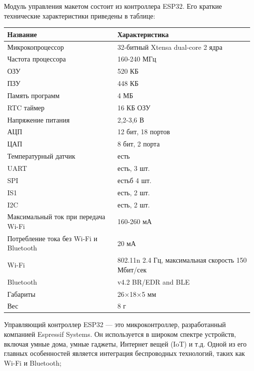Модуль управления макетом состоит из контроллера ESP32. Его краткие технические характеристики приведены в таблице:

\begin{table}[H]
    \centering
    \begin{tabular}{|p{6.5cm}|p{7.5cm}|}
        \hline
        Название & Характеристика \\
        \hline
        Микрокопроцессор & 32-битный Xtensa dual-core 2 ядра \\
        \hline
        Частота процессора & 160-240 МГц \\
        \hline
        ОЗУ & 520 КБ \\
        \hline
        ПЗУ & 448 КБ \\
        \hline
        Память программ & 4 МБ \\
        \hline
        RTC таймер & 16 КБ ОЗУ \\
        \hline
        Напряжение питания & 2,2-3,6 В \\
        \hline
        АЦП & 12 бит, 18 портов \\
        \hline
        ЦАП & 8 бит, 2 порта \\
        \hline
        Температурный датчик & есть \\
        \hline
        UART & есть, 3 шт. \\
        \hline
        SPI & естьб 4 шт. \\
        \hline
        IS1 & есть, 2 шт. \\
        \hline
        I2C & есть, 2 шт. \\
        \hline
        Максимальный ток при передача Wi-Fi & 160-260 мА \\
        \hline
        Потребление тока без Wi-Fi и Bluetooth & 20 мА \\
        \hline
        Wi-Fi & 802.11n 2.4 Гц, максимальная скорость 150 Мбит/сек \\
        \hline
        Bluetooth & v4.2 BR/EDR and BLE \\
        \hline
        Габариты & 26×18×5 мм \\
        \hline
        Вес & 8 г \\
        \hline
    \end{tabular}
    \label{tab:esp}
\end{table}

Управляющий контроллер ESP32 --- это микроконтроллер, разработанный компанией Espressif Systems. Он используется в широком спектре устройств, включая умные дома, умные гаджеты, Интернет вещей (IoT) и т.д. Одной из его главных особенностей является интеграция беспроводных технологий, таких как Wi-Fi и Bluetooth;

